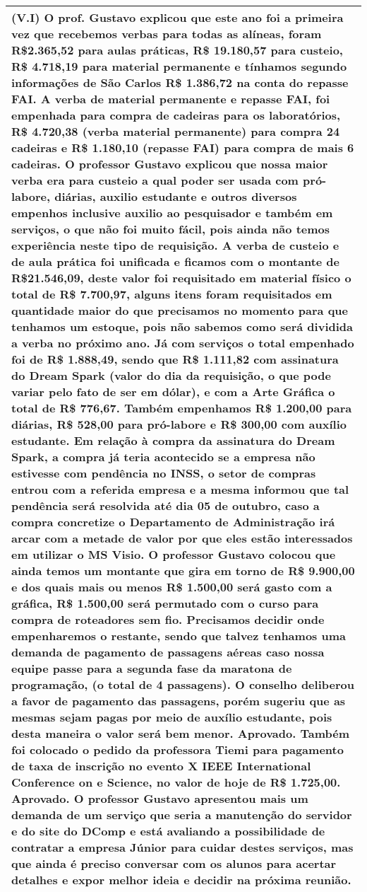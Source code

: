 \begin{longtable}{|p{17.5cm}|}
 \\ \hline 
(V.I) O prof. Gustavo explicou que este ano foi a primeira vez que recebemos verbas para todas as alíneas, foram R\$2.365,52 para aulas práticas, R\$ 19.180,57 para custeio, R\$ 4.718,19 para material permanente e tínhamos segundo informações de São Carlos R\$ 1.386,72 na conta do repasse FAI. A verba de material permanente e repasse FAI, foi empenhada para compra de cadeiras para os laboratórios, R\$ 4.720,38 (verba material permanente) para compra 24 cadeiras e R\$ 1.180,10 (repasse FAI) para compra de mais 6 cadeiras. O professor Gustavo explicou que nossa maior verba era para custeio a qual poder ser usada com pró-labore, diárias, auxilio estudante e outros diversos empenhos inclusive auxilio ao pesquisador e também em serviços, o que não foi muito fácil, pois ainda não temos experiência neste tipo de requisição. A verba de custeio e de aula prática foi unificada e ficamos com o montante de R\$21.546,09, deste valor foi requisitado em material físico o total de R\$ 7.700,97, alguns itens foram requisitados em quantidade maior do que precisamos no momento para que tenhamos um estoque, pois não sabemos como será dividida a verba no próximo ano. Já com serviços o total empenhado foi de R\$ 1.888,49, sendo que R\$ 1.111,82 com assinatura do Dream Spark (valor do dia da requisição, o que pode variar pelo fato de ser em dólar), e com a Arte Gráfica o total de R\$ 776,67. Também empenhamos R\$ 1.200,00 para diárias, R\$ 528,00 para pró-labore e R\$ 300,00 com auxílio estudante. Em relação à compra da assinatura do Dream Spark, a compra já teria acontecido se a empresa não estivesse com pendência no INSS, o setor de compras entrou com a referida empresa e a mesma informou que tal pendência será resolvida até dia 05 de outubro, caso a compra concretize o Departamento de Administração irá arcar com a metade de valor por que eles estão interessados em utilizar o MS Visio. O professor Gustavo colocou que ainda temos um montante que gira em torno de R\$ 9.900,00 e dos quais mais ou menos R\$ 1.500,00 será gasto com a gráfica, R\$ 1.500,00 será permutado com o curso para compra de roteadores sem fio. Precisamos decidir onde empenharemos o restante, sendo que talvez tenhamos uma demanda de pagamento de passagens aéreas caso nossa equipe passe para a segunda fase da maratona de programação, (o total de 4 passagens). O conselho deliberou a favor de pagamento das passagens, porém sugeriu que as mesmas sejam pagas por meio de auxílio estudante, pois desta maneira o valor será bem menor. Aprovado. Também foi colocado o pedido da professora Tiemi para pagamento de taxa de inscrição no evento X IEEE International Conference on e Science, no valor de hoje de R\$ 1.725,00. Aprovado. O professor Gustavo apresentou mais um demanda de um serviço que seria a manutenção do servidor e do site do DComp e está avaliando a possibilidade de contratar a empresa Júnior para cuidar destes serviços, mas que ainda é preciso conversar com os alunos para acertar detalhes e expor melhor ideia e decidir na próxima reunião.

 \\ \hline 

\end{longtable} 

